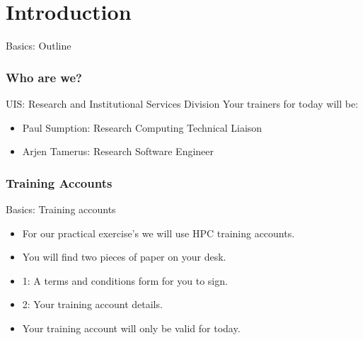\part{Introduction}
\frame{\partpage}

\begin{frame}{Basics: Outline}
\small
  \tableofcontents[subsectionstyle=hide]%
\end{frame}

\section{Who are we?}
\begin{frame}{UIS: Research and Institutional Services Division}
Your trainers for today will be:\\
\begin{itemize}
\item{Paul Sumption: Research Computing Technical Liaison}
\item{Arjen Tamerus: Research Software Engineer}
\end{itemize}
\end{frame}

\section{Training Accounts}
\begin{frame}{Basics: Training accounts}
\begin{itemize}
\item{\alert{For our practical exercise's we will use HPC training accounts.}}
\pause
\item{You will find two pieces of paper on your desk.}
\pause
\item{1: A terms and conditions form for you to sign.}
\pause
\item{2: Your training account details.}
\pause
\item{Your training account will only be valid for today.}
\end{itemize}
\end{frame}

